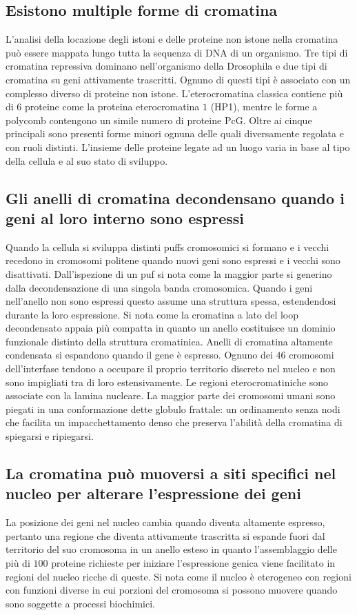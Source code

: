 \subsection{Esistono multiple forme di cromatina}
L'analisi della locazione degli istoni e delle proteine non istone nella cromatina pu\`o essere mappata lungo tutta la sequenza di DNA di un organismo. Tre tipi di cromatina repressiva
dominano nell'organismo della Drosophila e due tipi di cromatina su geni attivamente trascritti. Ognuno di questi tipi \`e associato con un complesso diverso di proteine non istone. 
L'eterocromatina classica contiene pi\`u di $6$ proteine come la proteina eterocromatina $1$ (HP1), mentre le forme a polycomb contengono un simile numero di proteine PcG. Oltre ai 
cinque principali sono presenti forme minori ognuna delle quali diversamente regolata e con ruoli distinti. L'insieme delle proteine legate ad un luogo varia in base al tipo della 
cellula e al suo stato di sviluppo.
\subsection{Gli anelli di cromatina decondensano quando i geni al loro interno sono espressi}
Quando la cellula si sviluppa distinti puffs cromosomici si formano e i vecchi recedono in cromosomi politene quando nuovi geni sono espressi e i vecchi sono disattivati. Dall'ispezione
di un puf si nota come la maggior parte si generino dalla decondensazione di una singola banda cromosomica. Quando i geni nell'anello non sono espressi questo assume una struttura 
spessa, estendendosi durante la loro espressione. Si nota come la cromatina a lato del loop decondensato appaia pi\`u compatta in quanto un anello costituisce un dominio funzionale
distinto della struttura cromatinica. Anelli di cromatina altamente condensata si espandono quando il gene \`e espresso. Ognuno dei $46$ cromosomi dell'interfase tendono a occupare il 
proprio territorio discreto nel nucleo e non sono impigliati tra di loro estensivamente. Le regioni eterocromatiniche sono associate con la lamina nucleare. La maggior parte dei 
cromosomi umani sono piegati in una conformazione dette globulo frattale: un ordinamento senza nodi che facilita un impacchettamento denso che preserva l'abilit\`a della cromatina di
spiegarsi e ripiegarsi.
\subsection{La cromatina pu\`o muoversi a siti specifici nel nucleo per alterare l'espressione dei geni}
La posizione dei geni nel nucleo cambia quando diventa altamente espresso, pertanto una regione che diventa attivamente trascritta si espande fuori dal territorio del suo cromosoma in
un anello esteso in quanto l'assemblaggio delle pi\`u di $100$ proteine richieste per iniziare l'espressione genica viene facilitato in regioni del nucleo ricche di queste. Si nota come
il nucleo \`e eterogeneo con regioni con funzioni diverse in cui porzioni del cromosoma si possono muovere quando sono soggette a processi biochimici.
